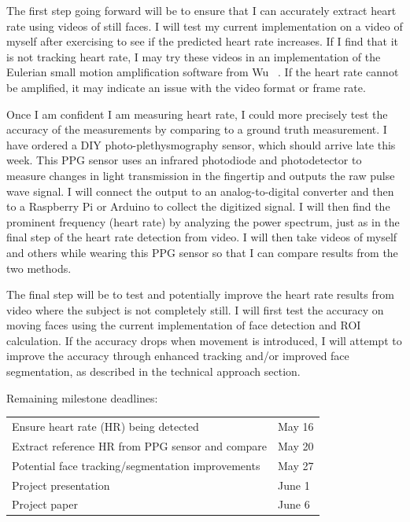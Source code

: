 \documentclass[11pt,twocolumn,letterpaper]{article}
\begin{document}
The first step going forward will be to ensure that I can accurately extract heart rate using videos of still faces. I will test my current implementation on a video of myself after exercising to see if the predicted heart rate increases. If I find that it is not tracking heart rate, I may try these videos in an implementation of the Eulerian small motion amplification software from Wu \etal~\cite{Wu:2012aa}. If the heart rate cannot be amplified, it may indicate an issue with the video format or frame rate.

Once I am confident I am measuring heart rate, I could more precisely test the accuracy of the measurements by comparing to a ground truth measurement. I have ordered a DIY photo-plethysmography sensor, which should arrive late this week. This PPG sensor uses an infrared photodiode and photodetector to measure changes in light transmission in the fingertip and outputs the raw pulse wave signal. I will connect the output to an analog-to-digital converter and then to a Raspberry Pi or Arduino to collect the digitized signal. I will then find the prominent frequency (heart rate) by analyzing the power spectrum, just as in the final step of the heart rate detection from video. I will then take videos of myself and others while wearing this PPG sensor so that I can compare results from the two methods.

The final step will be to test and potentially improve the heart rate results from video where the subject is not completely still. I will first test the accuracy on moving faces using the current implementation of face detection and ROI calculation. If the accuracy drops when movement is introduced, I will attempt to improve the accuracy through enhanced tracking and/or improved face segmentation, as described in the technical approach section.

Remaining milestone deadlines:

\begin{table}[h]
\centering
\begin{tabular}{ll}
	Ensure heart rate (HR) being detected 				& May 16\\
	Extract reference HR from PPG sensor and compare	& May 20\\
	Potential face tracking/segmentation improvements 		& May 27\\
	Project presentation 								& June 1\\
	Project paper 									& June 6\\
\end{tabular}
\end{table}


{\small


}
\end{document}
